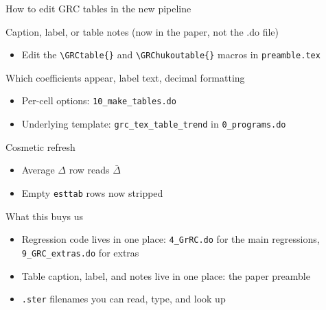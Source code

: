 \documentclass[10pt,aspectratio=169]{beamer}
\newcommand{\code}[1]{\texttt{\small #1}}
\begin{document}
\begin{frame}{How to edit GRC tables in the new pipeline}

\textcolor{cktblue}{Caption, label, or table notes} (now in the paper, not the .do file)
\begin{itemize}\setlength\itemsep{2pt}
    \item Edit the \code{\textbackslash GRCtable\{\}} and \code{\textbackslash GRChukoutable\{\}} macros in \code{preamble.tex}
\end{itemize}

\medskip
\textcolor{cktblue}{Which coefficients appear, label text, decimal formatting}
\begin{itemize}\setlength\itemsep{2pt}
    \item Per-cell options: \code{10\_make\_tables.do}
    \item Underlying template: \code{grc\_tex\_table\_trend} in \code{0\_programs.do}
\end{itemize}

\medskip
\textcolor{cktblue}{Cosmetic refresh}
\begin{itemize}\setlength\itemsep{2pt}
    \item Average $\Delta$ row reads $\bar{\Delta}$
    \item Empty \code{esttab} rows now stripped
\end{itemize}

\end{frame}

\begin{frame}{What this buys us}

\begin{itemize}\setlength\itemsep{4pt}
    \item Regression code lives in one place: \code{4\_GrRC.do} for the main regressions, \code{9\_GRC\_extras.do} for extras
    \item Table caption, label, and notes live in one place: the paper preamble
    \item \code{.ster} filenames you can read, type, and look up
\end{itemize}

\end{frame}
\end{document}

